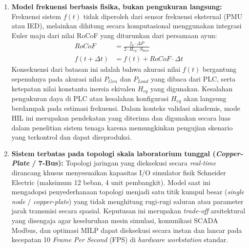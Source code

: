 \begin{enumerate}
    \item[a.] \textbf{Model frekuensi berbasis fisika, bukan pengukuran langsung:} Frekuensi sistem $f(t)$ tidak diperoleh dari sensor frekuensi eksternal (PMU atau IED), melainkan dihitung secara komputasional menggunakan integrasi Euler maju dari nilai RoCoF yang diturunkan dari persamaan ayun:
\begin{equation}
\begin{aligned}
    RoCoF &= \frac{f_{0}\cdot\Delta P}{2\cdot H_{eq}\cdot S_{base}} \\
    f(t+\Delta t) &= f(t)+RoCoF\cdot\Delta t
\end{aligned}
\end{equation}
    Konsekuensi dari batasan ini adalah bahwa akurasi nilai $f(t)$ bergantung sepenuhnya pada akurasi nilai $P_{Gen}$ dan $P_{Load}$ yang dibaca dari PLC, serta ketepatan nilai konstanta inersia ekivalen $H_{eq}$ yang digunakan. Kesalahan pengukuran daya di PLC atau kesalahan konfigurasi $H_{eq}$ akan langsung berdampak pada estimasi frekuensi. Dalam konteks validasi akademis, mode HIL ini merupakan pendekatan yang diterima dan digunakan secara luas dalam penelitian sistem tenaga karena memungkinkan pengujian skenario yang terkontrol dan dapat direproduksi.
    \item[b.] \textbf{Sistem terbatas pada topologi skala laboratorium tunggal (\textit{Copper-Plate} / 7-Bus):} Topologi jaringan yang dieksekusi secara \textit{real-time} dirancang khusus menyesuaikan kapasitas I/O simulator fisik Schneider Electric (maksimum 12 beban, 4 unit pembangkit). Model saat ini mengadopsi penyederhanaan topologi menjadi satu titik kumpul besar (\textit{single node} / \textit{copper-plate}) yang tidak menghitung rugi-rugi saluran atau parameter jarak transmisi secara spasial. Keputusan ini merupakan \textit{trade-off} arsitektural yang disengaja agar keseluruhan mesin simulasi, komunikasi SCADA Modbus, dan optimasi MILP dapat dieksekusi secara instan dan lancar pada kecepatan 10 \textit{Frame Per Second} (FPS) di \textit{hardware workstation} standar. 
    

\end{enumerate}
